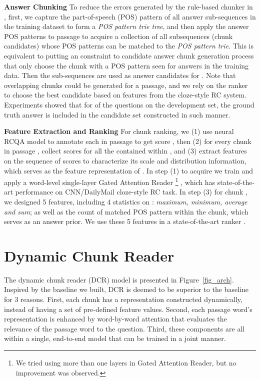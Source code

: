 \documentclass[letterpaper]{article}
\newcommand{\dcr}{DCR}
\begin{document}
\noindent\textbf{Answer Chunking}
To reduce the errors generated by the rule-based chunker in \cite{rajpurkar2016squad}, first, we capture the part-of-speech (POS) pattern of all answer sub-sequences in the training dataset to form a \textit{POS pattern trie tree}, and then apply the answer POS patterns to passage  to acquire a collection of all subsequences (chunk candidates)  whose POS patterns can be matched to the \textit{POS pattern trie}. This is equivalent to putting an constraint  to candidate answer chunk generation process that only choose the chunk with a POS pattern seen for answers in the training data. Then the sub-sequences  are used as answer candidates for . Note that overlapping chunks could be generated for a passage, and we rely on the ranker to choose the best candidate based on features from the cloze-style RC system. Experiments showed that for  of the questions on the development set, the ground truth answer is included in the candidate set constructed in such manner.

\noindent\textbf{Feature Extraction and Ranking} 
For chunk ranking, we (1) use neural RCQA model to annotate each  in passage  to get score , then (2) for every chunk  in passage , collect scores  for all the  contained within , and (3) extract features on the sequence of scores  to characterize its scale and distribution information, which serves as the feature representation of . In step (1) to acquire  we train and apply a word-level single-layer Gated Attention Reader \footnote{We tried using more than one layers in Gated Attention Reader, but no improvement was observed.} \cite{dhingra2016gated}, which has state-of-the-art performance on CNN/DailyMail cloze-style RC task. In step (3) for chunk , we designed 5 features, including 4 statistics on : \textit{maximum, minimum, average and sum}; as well as the count of matched POS pattern within the chunk, which serves as an answer prior. We use these 5 features in a state-of-the-art ranker \cite{Ganji:2011:SIGIR}.

\section{Dynamic Chunk Reader}
\label{sect_dcr}
The dynamic chunk reader (\dcr) model is presented in Figure~\ref{fig_arch}. Inspired by the baseline we built, DCR is deemed to be superior to the baseline for 3 reasons. First, each chunk has a representation constructed dynamically, instead of having a set of pre-defined feature values. Second, each passage word's representation is enhanced by word-by-word attention that evaluates the relevance of the passage word to the question. Third, these components are all within a single, end-to-end model that can be trained in a joint manner.
\end{document}
